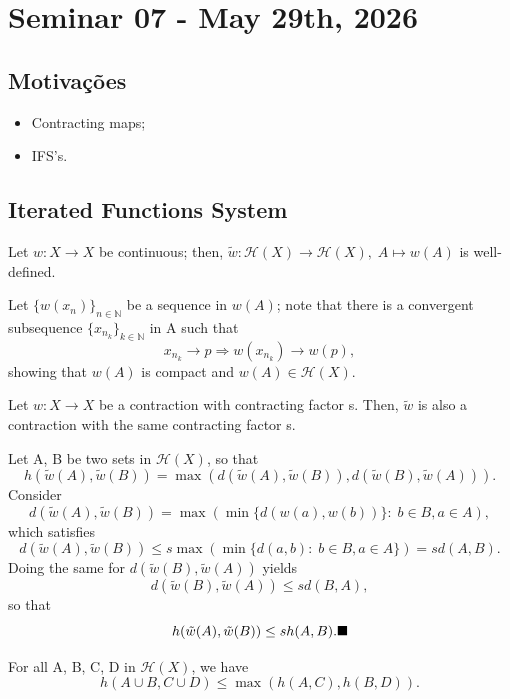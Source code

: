 \documentclass[../fractals_everywhere.tex]{subfiles}
\begin{document}
\section{Seminar 07 - May 29th, 2026}
\subsection{Motivações}
\begin{itemize}
	\item Contracting maps;
	\item IFS's.
\end{itemize}
\subsection{Iterated Functions System}
\begin{lemma*}
	Let \(w:X\rightarrow X\) be continuous; then, \(\tilde{w}:\mathcal{H}(X)\rightarrow \mathcal{H}(X),\; A \mapsto w(A)\) is well-defined.
\end{lemma*}
\begin{proof*}
	Let \(\{w(x_{n})\}_{n\in \mathbb{N}}\) be a sequence in \(w(A)\); note that there is a convergent subsequence \(\{x_{n_{k}}\}_{k\in \mathbb{N}}\) in A such that
	\[
		x_{n_{k}}\rightarrow p \Rightarrow w(x_{n_{k}})\rightarrow w(p),
	\]
	showing that \(w(A)\) is compact and \(w(A)\in \mathcal{H}(X)\). \qedsymbol
\end{proof*}
\begin{lemma*}
	Let \(w:X\rightarrow X\) be a contraction with contracting factor s. Then, \(\tilde{w}\) is also a contraction with the same contracting factor s.
\end{lemma*}
\begin{proof*}
	Let A, B be two sets in \(\mathcal{H}(X)\), so that
	\[
		h(\tilde{w}(A), \tilde{w}(B)) = \max\limits_{}(d(\tilde{w}(A), \tilde{w}(B)), d(\tilde{w}(B), \tilde{w}(A))).
	\]
	Consider
	\[
		d(\tilde{w}(A), \tilde{w}(B)) = \max\limits_{}(\min\limits_{}\{d(w(a), w(b))\}:\;b\in B, a\in A),
	\]
	which satisfies
	\[
		d(\tilde{w}(A), \tilde{w}(B))\leq s \max\limits_{}(\min\limits_{}\{d(a, b):\;b\in B, a\in A\}) = s d(A, B).
	\]
	Doing the same for \(d(\tilde{w}(B), \tilde{w}(A))\) yields
	\[
		d(\tilde{w}(B), \tilde{w}(A))\leq sd(B, A),
	\]
	so that
	\[
		h(\tilde{w}(A), \tilde{w}(B)) \leq sh(A, B). \text{$\blacksquare$}
	\]
\end{proof*}
\begin{lemma*}
	For all A, B, C, D in \(\mathcal{H}(X)\), we have
	\[
		h(A\cup B, C\cup D)\leq \max\limits_{}(h(A, C), h(B, D)).
	\]
\end{lemma*}
\end{document}
